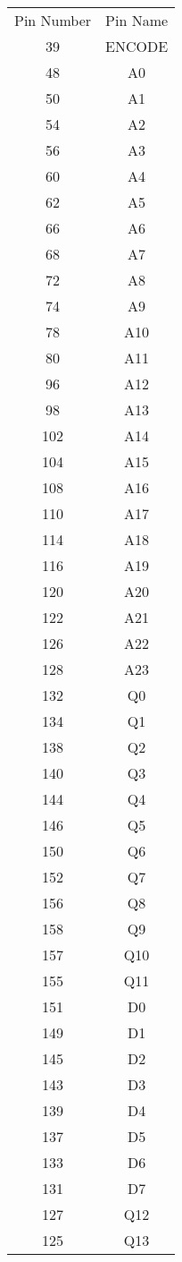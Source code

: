 \begin{table}[h]
\centering
\begin{tabular}{|c|c|}
Pin Number & Pin Name \\
39 & ENCODE \\
48 & A0 \\
50 & A1 \\
54 & A2 \\
56 & A3 \\
60 & A4 \\
62 & A5 \\
66 & A6 \\
68 & A7 \\
72 & A8 \\
74 & A9 \\
78 & A10 \\
80 & A11 \\
96 & A12 \\
98 & A13 \\
102 & A14 \\
104 & A15 \\
108 & A16 \\
110 & A17 \\
114 & A18 \\
116 & A19 \\
120 & A20 \\
122 & A21 \\
126 & A22 \\
128 & A23 \\
132 & Q0 \\
134 & Q1 \\
138 & Q2 \\
140 & Q3 \\
144 & Q4 \\
146 & Q5 \\
150 & Q6 \\
152 & Q7 \\
156 & Q8 \\
158 & Q9 \\
157 & Q10 \\
155 & Q11 \\
151 & D0 \\
149 & D1 \\
145 & D2 \\
143 & D3 \\
139 & D4 \\
137 & D5 \\
133 & D6 \\
131 & D7 \\
127 & Q12 \\
125 & Q13 \\

\end{tabular}
\end{table}
